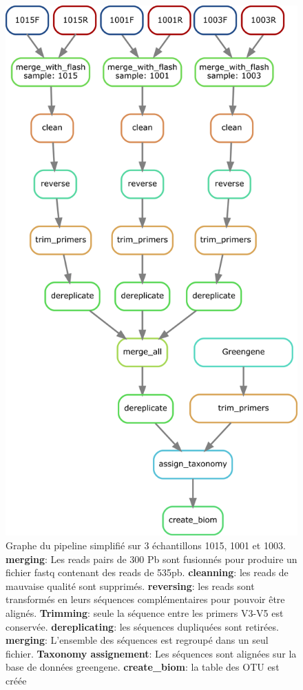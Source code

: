 \documentclass[12pt,a4paper]{article}
\begin{document}
\begin{figure}[!ht]
\begin{center}
\includegraphics[scale=0.5]{img/pipeline_trio.png}\hfill
\end{center}
\caption{Graphe du pipeline simplifié sur 3 échantillons 1015, 1001 et 1003.\\ \textbf{merging}: Les reads pairs de 300 Pb sont fusionnés  pour produire un fichier fastq contenant des reads de 535pb. \textbf{cleanning}: les reads de mauvaise qualité sont supprimés. \textbf{reversing}: les reads sont transformés en leurs séquences complémentaires pour pouvoir être alignés. \textbf{Trimming}: seule la séquence entre les primers V3-V5 est conservée. \textbf{dereplicating}: les séquences dupliquées sont retirées. \textbf{merging}: L'ensemble des séquences est regroupé dans un seul fichier. \textbf{Taxonomy assignement}: Les séquences sont alignées sur la base de données greengene. \textbf{create\_biom}: la table des OTU est créée }
\label{pipeline_trio}
\end{figure}
\end{document}
